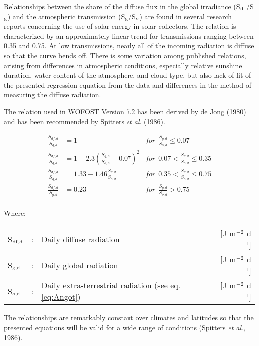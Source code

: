 Relationships between the share of the diffuse flux in the global irradiance 
(S$_{{\rm df}}$/S$_{{\rm g}}$) and the atmospheric transmission 
(S$_{{\rm g}}$/S$_{{\rm o}}$) are found in several research reports concerning the use
of solar energy in solar collectors. The relation is characterized by an approximately
linear trend for transmissions ranging between 0.35 and 0.75. At low transmissions,
nearly all of the incoming radiation is diffuse so that the curve bends off.
There is some variation among published relations, arising from differences in atmospheric 
conditions, especially relative sunshine duration, water content of the atmosphere,
and cloud type, but also lack of fit of the presented regression equation from the data and
differences in the method of measuring the diffuse radiation.

The relation used in WOFOST Version 7.2 has been derived by de Jong (1980) and has
been recommended by Spitters {\it et al}. (1986).

\begin{align}
\label{eq:irrad_diffuse}
{\frac{S _{df,d} }{S _{g, d} }} &= 1 & 
for ~~ {\frac{S _{g,d} }{S _{o,d} }} \le 0.07 \nonumber \\
{\frac{S _{df,d} }{S _{g,d} }} &= 1-2.3({\frac{S _{g,d} }{S _{o,d} }} -0.07) ^{2} & 
for ~~ 0.07 < {\frac{S _{g,d} }{S _{o,d} }} \le 0.35  \nonumber \\
{\frac{S _{df,d} }{S _{g,d} }} &= 1.33-1.46{\frac{S _{g,d} }{S _{o,d} }} &
for ~~ 0.35 < {\frac{S _{g,d} }{S _{o,d} }} \le 0.75 \nonumber \\
{\frac{S _{df,d} }{S _{g,d} }} &= 0.23 &
for ~~ {\frac{S _{g,d} }{S _{o,d} }} > 0.75 \nonumber \\
\end{align}

Where:\\[5pt]
\begin{tabularx}{\textwidth}{llXr}
	S$_{{\rm df,d}}$ &:& Daily diffuse radiation  & [J m$^{{\rm -2}}$ d$^{{\rm -1}}$]\\
	S$_{{\rm g,d}}$ &:& Daily global radiation  & [J m$^{{\rm -2}}$ d$^{{\rm -1}}$]\\
	S$_{{\rm o,d}}$ &:& Daily extra-terrestrial radiation (see eq. \ref{eq:Angot})  & 
	[J m$^{{\rm -2}}$ d$^{{\rm -1}}$]\\
\end{tabularx}

The relationships are remarkably constant over climates and latitudes so that the presented
equations will be valid for a wide range of conditions (Spitters {\it et al}., 1986).

